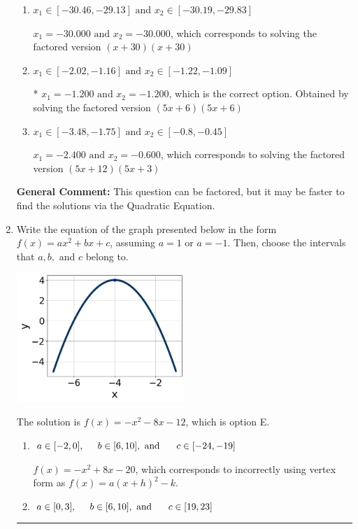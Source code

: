 \documentclass{extbook}[14pt]
\newcommand{\litem}[1]{\item #1

\rule{\textwidth}{0.4pt}}
\begin{document}
\begin{enumerate}
{\begin{enumerate}[label=\Alph*.]
$x_1 = -6.000 \text{ and } x_2 = -0.240$, which corresponds to solving the factored version $(x + 6)(25x + 6)$
\item \( x_1 \in [-30.46, -29.13] \text{ and } x_2 \in [-30.19, -29.83] \)

$x_1 = -30.000 \text{ and } x_2 = -30.000$, which corresponds to solving the factored version $(x + 30)(x + 30)$
\item \( x_1 \in [-2.02, -1.16] \text{ and } x_2 \in [-1.22, -1.09] \)

* $x_1 = -1.200 \text{ and } x_2 = -1.200$, which is the correct option. Obtained by solving the factored version $(5x + 6)(5x + 6)$
\item \( x_1 \in [-3.48, -1.75] \text{ and } x_2 \in [-0.8, -0.45] \)

$x_1 = -2.400 \text{ and } x_2 = -0.600$, which corresponds to solving the factored version $(5x + 12)(5x + 3)$
\end{enumerate}

\textbf{General Comment:} This question can be factored, but it may be faster to find the solutions via the Quadratic Equation.
}
\litem{
Write the equation of the graph presented below in the form $f(x)=ax^2+bx+c$, assuming  $a=1$ or $a=-1$. Then, choose the intervals that $a, b,$ and $c$ belong to.

\begin{center}
    \includegraphics[width=0.5\textwidth]{../Figures/quadraticGraphToEquationCopyB.png}
\end{center}




The solution is \( f(x) = -x^{2} -8 x -12 \), which is option E.\begin{enumerate}[label=\Alph*.]
\item \( a \in [-2, 0], \hspace*{5mm} b \in [6, 10], \text{ and } \hspace*{5mm} c \in [-24, -19] \)

$f(x)=-x^{2} +8 x -20$, which corresponds to incorrectly using vertex form as $f(x) = a(x+h)^2 - k$.
\item \( a \in [0, 3], \hspace*{5mm} b \in [6, 10], \text{ and } \hspace*{5mm} c \in [19, 23] \)


\end{enumerate}}
\end{enumerate}
\end{document}
